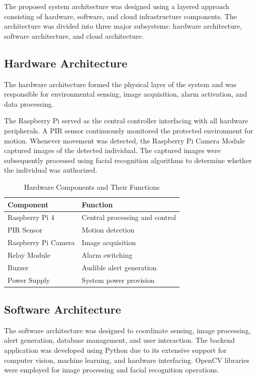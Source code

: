 \documentclass[12pt,a4paper,oneside]{report}
\begin{document}
The proposed system architecture was designed using a layered approach consisting of hardware, software, and cloud infrastructure components. The architecture was divided into three major subsystems: hardware architecture, software architecture, and cloud architecture.

\subsection{Hardware Architecture}

The hardware architecture formed the physical layer of the system and was responsible for environmental sensing, image acquisition, alarm activation, and data processing.

The Raspberry Pi served as the central controller interfacing with all hardware peripherals. A PIR sensor continuously monitored the protected environment for motion. Whenever movement was detected, the Raspberry Pi Camera Module captured images of the detected individual. The captured images were subsequently processed using facial recognition algorithms to determine whether the individual was authorized.

\begin{table}[htbp]
  \centering
  \caption{Hardware Components and Their Functions}
  {\small
  \begin{tabular}{|p{5.00cm}|p{8.00cm}|}
    \hline
    \textbf{Component} & \textbf{Function} \\
    \hline
    Raspberry Pi 4         & Central processing and control \\
    PIR Sensor             & Motion detection \\
    Raspberry Pi Camera    & Image acquisition \\
    Relay Module           & Alarm switching \\
    Buzzer                 & Audible alert generation \\
    Power Supply           & System power provision \\
    \hline
  \end{tabular}
  }
\end{table}

\subsection{Software Architecture}

The software architecture was designed to coordinate sensing, image processing, alert generation, database management, and user interaction. The backend application was developed using Python due to its extensive support for computer vision, machine learning, and hardware interfacing. OpenCV libraries were employed for image processing and facial recognition operations.
\end{document}
